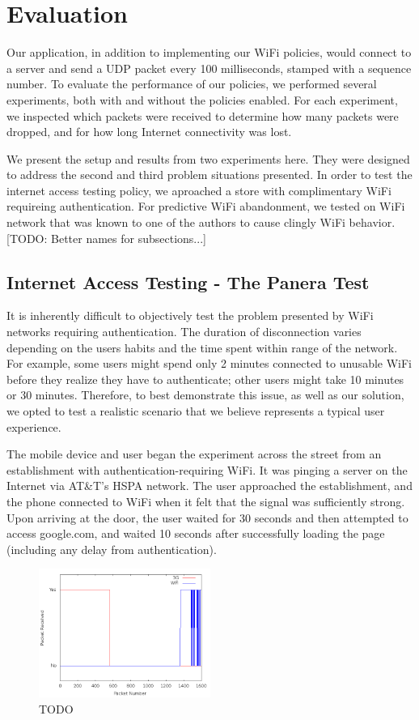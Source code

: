 \section{Evaluation}
\label{sec:eval}

Our application, in addition to implementing our WiFi policies, would connect to a server and send a UDP packet every 100 milliseconds, stamped with a sequence number. To evaluate the performance of our policies, we performed several experiments, both with and without the policies enabled. For each experiment, we inspected which packets were received to determine how many packets were dropped, and for how long Internet connectivity was lost.

We present the setup and results from two experiments here. They were designed to address the second and third problem situations presented. In order to test the internet access testing policy, we aproached a store with complimentary WiFi requireing authentication. For predictive WiFi abandonment, we tested on WiFi network that was known to one of the authors to cause clingly WiFi behavior. [TODO: Better names for subsections...]

\subsection{Internet Access Testing - The Panera Test}
It is inherently difficult to objectively test the problem presented by WiFi networks requiring authentication. The duration of disconnection varies depending on the users habits and the time spent within range of the network. For example, some users might spend only 2 minutes connected to unusable WiFi before they realize they have to authenticate; other users might take 10 minutes or 30 minutes. Therefore, to best demonstrate this issue, as well as our solution, we opted to test a realistic scenario that we believe represents a typical user experience.

The mobile device and user began the experiment across the street from an establishment with authentication-requiring WiFi. It was pinging a server on the Internet via AT\&T's HSPA network. The user approached the establishment, and the phone connected to WiFi when it felt that the signal was sufficiently strong. Upon arriving at the door, the user waited for 30 seconds and then attempted to access google.com, and waited 10 seconds after successfully loading the page (including any delay from authentication).

\begin{figure}
	\includegraphics[width=0.5\textwidth]{paneraNoPolicy}
	\caption{TODO}
\end{figure}

